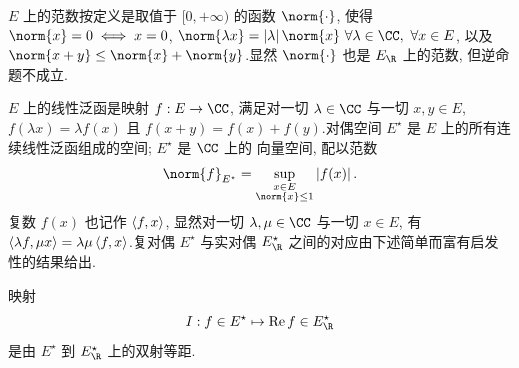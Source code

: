 $E$ 上的范数按定义是取值于 $[0,+\infty)$ 的函数 $\norm{\cdot}$, 使得
$\norm{x}=0\iff x=0$, $\norm{\lambda x}=\abs{\lambda}\norm{x}\ \forall\lambda\in\CC,
\ \forall x\in E$, 以及 $\norm{x+y}\le\norm{x}+\norm{y}$.显然
$\norm{\cdot}$ 也是 $E_\R$ 上的范数, 但逆命题不成立.

$E$ 上的线性泛函是映射 $f:E\to\CC$, 满足对一切 $\lambda\in\CC$ 与一切
$x,y\in E$, $f(\lambda x)=\lambda f(x)$ 且 $f(x+y)=f(x)+f(y)$.对偶空间
$E^\star$ 是 $E$ 上的所有连续线性泛函组成的空间; $E^\star$ 是 $\CC$ 上的
向量空间, 配以范数
\begin{equation*}
\norm{f}_{E^\star}=\sup_{\substack{x\in E\\\norm{x}\le1}}\abs{f(x)}.
\end{equation*}
复数 $f(x)$ 也记作 $\left\langle f,x\right\rangle$, 显然对一切 $\lambda,\mu\in\CC$ 与一切
$x\in E$, 有 $\left\langle \lambda f,\mu x\right\rangle=\lambda\mu\left\langle f,x\right\rangle$.复对偶
$E^\star$ 与实对偶 $E^\star_\R$ 之间的对应由下述简单而富有启发性的结果给出.

\begin{proposition}
\label{prop:11.22}
映射
\begin{equation*}
I:f\in E^\star\mapsto\operatorname{Re}f\in E^\star_\R
\end{equation*}
是由 $E^\star$ 到 $E^\star_\R$ 上的双射等距.
\end{proposition}

